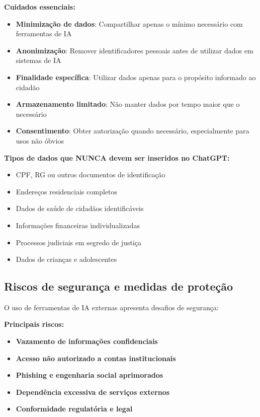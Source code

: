 \documentclass[12pt,a4paper]{book}
\begin{document}
\textbf{Cuidados essenciais:}
\begin{itemize}
    \item \textbf{Minimização de dados}: Compartilhar apenas o mínimo necessário com ferramentas de IA
    
    \item \textbf{Anonimização}: Remover identificadores pessoais antes de utilizar dados em sistemas de IA
    
    \item \textbf{Finalidade específica}: Utilizar dados apenas para o propósito informado ao cidadão
    
    \item \textbf{Armazenamento limitado}: Não manter dados por tempo maior que o necessário
    
    \item \textbf{Consentimento}: Obter autorização quando necessário, especialmente para usos não óbvios
\end{itemize}

\begin{tcolorbox}[atencao]
\textbf{Tipos de dados que NUNCA devem ser inseridos no ChatGPT:}
\begin{itemize}
    \item CPF, RG ou outros documentos de identificação
    \item Endereços residenciais completos
    \item Dados de saúde de cidadãos identificáveis
    \item Informações financeiras individualizadas
    \item Processos judiciais em segredo de justiça
    \item Dados de crianças e adolescentes
\end{itemize}
\end{tcolorbox}

\subsection{Riscos de segurança e medidas de proteção}

O uso de ferramentas de IA externas apresenta desafios de segurança:

\textbf{Principais riscos:}
\begin{itemize}
    \item \textbf{Vazamento de informações confidenciais}
    \item \textbf{Acesso não autorizado a contas institucionais}
    \item \textbf{Phishing e engenharia social aprimorados}
    \item \textbf{Dependência excessiva de serviços externos}
    \item \textbf{Conformidade regulatória e legal}
\end{itemize}
\end{document}
